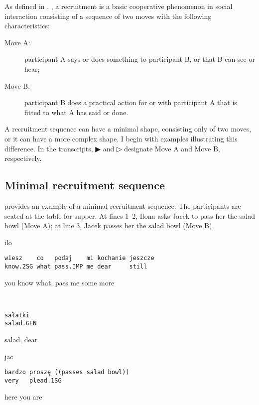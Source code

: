\documentclass[output=paper]{langsci/langscibook}
\begin{document}
As defined in , , a recruitment is a basic cooperative phenomenon in social interaction consisting of a sequence of two moves with the following characteristics:

\begin{description}
\item[Move A:] participant A says or does something to participant B, or that B can see or hear;
\item[Move B:] participant B does a practical action for or with participant A that is fitted to what A has said or done.
\end{description}

A recruitment sequence can have a minimal shape, consisting only of two moves, or it can have a more complex shape. I begin with examples illustrating this difference. In the transcripts, ▶ and ▷ designate Move A and Move B, respectively.

\subsection{Minimal recruitment sequence}

 provides an example of a minimal recruitment sequence.  The participants are seated at the table for supper.  At lines 1--2, Ilona asks Jacek to pass her the salad bowl (Move A); at line 3, Jacek passes her the salad bowl (Move B).

\vspace{-1mm}
%
\begin{mdframednoverticalspace}[style=firstfoc]
\begin{transbox}{1}{ilo}
\begin{verbatim}
wiesz    co   podaj    mi kochanie jeszcze
know.2SG what pass.IMP me dear     still
\end{verbatim}
you know what, pass me some more
\end{transbox}
\end{mdframednoverticalspace}
%
\begin{transbox}{2}{~}
\begin{verbatim}
sałatki
salad.GEN
\end{verbatim}
salad, dear
\end{transbox}
%
\begin{mdframednoverticalspace}[style=secondfoc]
\begin{transbox}{3}{jac}
\begin{verbatim}
bardzo proszę ((passes salad bowl))
very   plead.1SG
\end{verbatim}
here you are
\end{transbox}
\end{mdframednoverticalspace}
\end{document}
